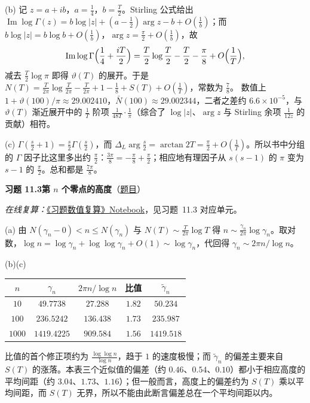 \documentclass[11pt,a4paper]{article}
\renewcommand{\Im}{\operatorname{Im}}
\newcommand{\Sol}[2]{%
  \par\addvspace{1.2em}\noindent
  \hypertarget{s:#1}{}\textbf{习题 #1\quad #2}\hfill{\small（\hyperlink{q:#1}{题目}）}\par
  \nopagebreak\smallskip}
\begin{document}
(b) 记 $z=a+ib$，$a=\frac14$，$b=\frac T2$。Stirling 公式给出
$\Im\log\Gamma(z)=b\log|z|+(a-\frac12)\arg z-b+O(\frac1b)$；而 $b\log|z|=b\log b+O(\frac1b)$，$\arg z=\frac\pi2+O(\frac1b)$，故
\[
  \Im\log\Gamma\Bigl(\frac14+\frac{iT}2\Bigr)=\frac T2\log\frac T2-\frac T2-\frac\pi8+O\Bigl(\frac1T\Bigr),
\]
减去 $\frac T2\log\pi$ 即得 $\vartheta(T)$ 的展开。于是 $N(T)=\frac T{2\pi}\log\frac T{2\pi}-\frac T{2\pi}+1-\frac18+S(T)+O(\frac1T)$，常数为 $\frac78$。
数值上 $1+\vartheta(100)/\pi\approx29.002410$，$\bar N(100)\approx29.002344$，二者之差约 $6.6\times10^{-5}$，与 $\vartheta(T)$ 渐近展开中的 $\frac1T$ 阶项 $\frac1{48T}\cdot\frac1\pi$（综合了 $\log|z|$、$\arg z$ 与 Stirling 余项 $\frac1{12z}$ 的贡献）相符。

(c) $\Gamma(\frac s2+1)=\frac s2\Gamma(\frac s2)$，而 $\Delta_L\arg\frac s2=\arctan2T=\frac\pi2+O(\frac1T)$。所以书中分组的 $\Gamma$ 因子比这里多出约 $\frac\pi2$：$\frac{3\pi}8=-\frac\pi8+\frac\pi2$；相应地有理因子从 $s(s-1)$ 的 $\pi$ 变为 $s-1$ 的 $\frac\pi2$。总和都是 $\frac{7\pi}8$。

\Sol{11.3}{第 $n$ 个零点的高度}
\emph{在线复算：}\href{https://colab.research.google.com/github/lichengtong123/lichengtong-RH/blob/main/\%E4\%B9\%A0\%E9\%A2\%98\%E4\%B8\%8E\%E8\%A7\%A3\%E7\%AD\%94/\%E4\%B9\%A0\%E9\%A2\%98\%E6\%95\%B0\%E5\%80\%BC\%E5\%A4\%8D\%E7\%AE\%97.ipynb}{《习题数值复算》Notebook}，见习题~11.3 对应单元。

(a) 由 $N(\gamma_n-0)<n\le N(\gamma_n)$ 与 $N(T)\sim\frac T{2\pi}\log T$ 得 $n\sim\frac{\gamma_n}{2\pi}\log\gamma_n$。取对数，$\log n=\log\gamma_n+\log\log\gamma_n+O(1)\sim\log\gamma_n$，代回得 $\gamma_n\sim2\pi n/\log n$。

(b)(c)
\begin{center}
\small
\begin{tabular}{@{}ccccc@{}}
\toprule
$n$ & $\gamma_n$ & $2\pi n/\log n$ & 比值 & $\tilde\gamma_n$ \\
\midrule
$10$ & $49.7738$ & $27.288$ & $1.82$ & $50.234$ \\
$100$ & $236.5242$ & $136.438$ & $1.73$ & $235.987$ \\
$1000$ & $1419.4225$ & $909.584$ & $1.56$ & $1419.518$ \\
\bottomrule
\end{tabular}
\end{center}
比值的首个修正项约为 $\frac{\log\log n}{\log n}$，趋于 $1$ 的速度极慢；而 $\tilde\gamma_n$ 的偏差主要来自 $S(T)$ 的涨落。本表三个近似值的偏差（约 $0.46$、$0.54$、$0.10$）都小于相应高度的平均间距（约 $3.04$、$1.73$、$1.16$）；但一般而言，高度上的偏差约为 $S(T)$ 乘以平均间距，而 $S(T)$ 无界，所以不能由此断言偏差总在一个平均间距以内。
\end{document}

